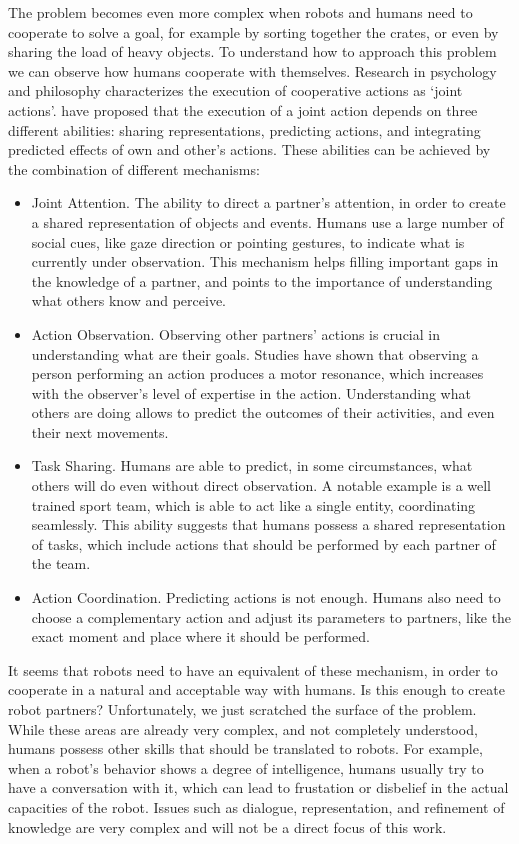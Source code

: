 The problem becomes even more complex when robots and humans need to cooperate to solve a goal, for example by sorting together the crates, or even by sharing the load of heavy objects. To understand  how to approach this problem we can observe how humans cooperate with themselves. Research in psychology and philosophy \citep{pacherie2012phenomenology} characterizes the execution of cooperative actions as `joint actions'. \cite{sebanz2006joint} have proposed that the execution of a joint action depends on three different abilities: sharing representations, predicting actions, and integrating predicted effects of own and other's actions. These abilities can be achieved by the combination of different mechanisms:
\begin{itemize}
\item Joint Attention. The ability to direct a partner's attention, in order to create a shared representation of objects and events. Humans use a large number of social cues, like gaze direction or pointing gestures, to indicate what is currently under observation. This mechanism helps filling important gaps in the knowledge of a partner, and points to the importance of understanding what others know and perceive.
\item Action Observation. Observing other partners' actions is crucial in understanding what are their goals. Studies have shown that observing a person performing an action produces a motor resonance, which increases with the observer's level of expertise in the action. Understanding what others are doing allows to predict the outcomes of their activities, and even their next movements.
\item Task Sharing. Humans are able to predict, in some circumstances, what others will do  even without direct observation. A notable example is a well trained sport team, which is able to act like a single entity, coordinating seamlessly. This ability suggests that humans possess a shared representation of tasks, which include actions that should be performed by each partner of the team.
\item Action Coordination. Predicting actions is not enough. Humans also need to choose a complementary action and adjust its parameters to partners, like the exact moment and place where it should be performed. 
\end{itemize}

It seems that robots need to have an equivalent of these mechanism, in order to cooperate in a natural and acceptable way with humans. Is this enough to create robot partners? Unfortunately, we just scratched the surface of the problem. While these areas are already very complex, and not completely understood, humans possess other skills that should be translated to robots. For example, when a robot's behavior shows a degree of intelligence, humans usually try to have a conversation with it, which can lead to frustation or disbelief in the actual capacities of the robot. Issues such as dialogue, representation, and refinement of knowledge are very complex and will not be a direct focus of this work.

